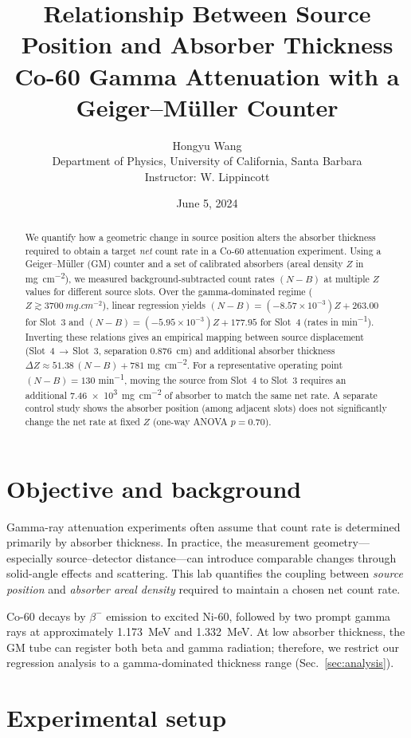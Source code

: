 \documentclass[11pt]{article}
\title{\textbf{Relationship Between Source Position and Absorber Thickness}\\
\textbf{Co-60 Gamma Attenuation with a Geiger--M\"uller Counter}}
\author{Hongyu Wang\\Department of Physics, University of California, Santa Barbara\\Instructor: W. Lippincott}
\date{June 5, 2024}
\begin{document}
\maketitle

\begin{abstract}
We quantify how a geometric change in source position alters the absorber thickness required to obtain a target \emph{net} count rate in a Co-60 attenuation experiment.
Using a Geiger--M\"uller (GM) counter and a set of calibrated absorbers (areal density $Z$ in \si{mg.cm^{-2}}), we measured background-subtracted count rates $(N-B)$ at multiple $Z$ values for different source slots.
Over the gamma-dominated regime ($Z\gtrsim\SI{3700}{mg.cm^{-2}}$), linear regression yields
$ (N-B) = (-8.57\times10^{-3})Z + 263.00$ for Slot~3 and $(N-B) = (-5.95\times10^{-3})Z + 177.95$ for Slot~4 (rates in \si{min^{-1}}).
Inverting these relations gives an empirical mapping between source displacement (Slot~4\,$\rightarrow$\,Slot~3, separation \SI{0.876}{cm}) and additional absorber thickness
$\Delta Z \approx 51.38\,(N-B) + 781$ \si{mg.cm^{-2}}.
For a representative operating point $(N-B)=130$ \si{min^{-1}}, moving the source from Slot~4 to Slot~3 requires an additional \SI{7.46e3}{mg.cm^{-2}} of absorber to match the same net rate.
A separate control study shows the absorber position (among adjacent slots) does not significantly change the net rate at fixed $Z$ (one-way ANOVA $p=0.70$).
\end{abstract}

\section{Objective and background}
Gamma-ray attenuation experiments often assume that count rate is determined primarily by absorber thickness.
In practice, the measurement geometry---especially source--detector distance---can introduce comparable changes through solid-angle effects and scattering.
This lab quantifies the coupling between \emph{source position} and \emph{absorber areal density} required to maintain a chosen net count rate.

Co-60 decays by $\beta^-$ emission to excited \mbox{Ni-60}, followed by two prompt gamma rays at approximately \SI{1.173}{MeV} and \SI{1.332}{MeV}.
At low absorber thickness, the GM tube can register both beta and gamma radiation; therefore, we restrict our regression analysis to a gamma-dominated thickness range (Sec.~\ref{sec:analysis}).

\section{Experimental setup}
\end{document}
